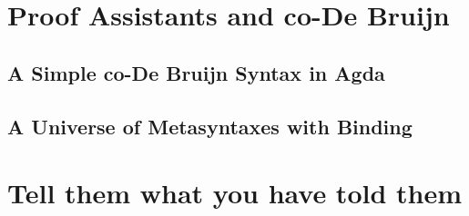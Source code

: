 \documentclass[runningheads]{llncs}
\begin{document}
\section{Proof Assistants and co-De Bruijn}
\subsection{A Simple co-De Bruijn Syntax in Agda}
\subsection{A Universe of Metasyntaxes with Binding}

\section{Tell them what you have told them}

\printbibliography{}
\end{document}
